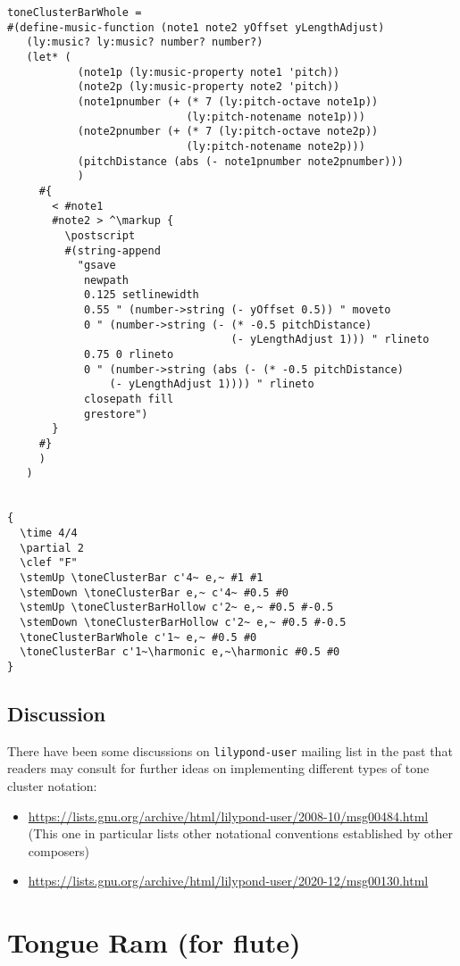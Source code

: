 \documentclass[11pt, oneside]{book}   	%
\begin{document}
\begin{verbatim}
toneClusterBarWhole =
#(define-music-function (note1 note2 yOffset yLengthAdjust)
   (ly:music? ly:music? number? number?)
   (let* (
           (note1p (ly:music-property note1 'pitch))
           (note2p (ly:music-property note2 'pitch))
           (note1pnumber (+ (* 7 (ly:pitch-octave note1p))
                            (ly:pitch-notename note1p)))
           (note2pnumber (+ (* 7 (ly:pitch-octave note2p))
                            (ly:pitch-notename note2p)))
           (pitchDistance (abs (- note1pnumber note2pnumber)))
           )
     #{
       < #note1
       #note2 > ^\markup {
         \postscript
         #(string-append
           "gsave
            newpath
            0.125 setlinewidth
            0.55 " (number->string (- yOffset 0.5)) " moveto
            0 " (number->string (- (* -0.5 pitchDistance)
                                   (- yLengthAdjust 1))) " rlineto
            0.75 0 rlineto
            0 " (number->string (abs (- (* -0.5 pitchDistance)
                (- yLengthAdjust 1)))) " rlineto
            closepath fill
            grestore")
       }
     #}
     )
   )


{
  \time 4/4
  \partial 2
  \clef "F"
  \stemUp \toneClusterBar c'4~ e,~ #1 #1
  \stemDown \toneClusterBar e,~ c'4~ #0.5 #0
  \stemUp \toneClusterBarHollow c'2~ e,~ #0.5 #-0.5
  \stemDown \toneClusterBarHollow c'2~ e,~ #0.5 #-0.5
  \toneClusterBarWhole c'1~ e,~ #0.5 #0
  \toneClusterBar c'1~\harmonic e,~\harmonic #0.5 #0
}
\end{verbatim}
\subsection{Discussion}
There have been some discussions on \verb|lilypond-user| mailing list in the past that readers may consult for further ideas on implementing different types of tone cluster notation: \begin{itemize}
\item \url{https://lists.gnu.org/archive/html/lilypond-user/2008-10/msg00484.html} (This one in particular lists other notational conventions established by other composers)
\item \url{https://lists.gnu.org/archive/html/lilypond-user/2020-12/msg00130.html}

\end{itemize}
\clearpage





\section {Tongue Ram (for flute)}
\hfill
\end{document}
